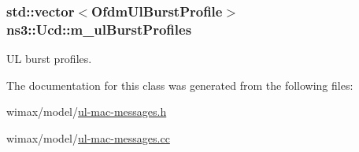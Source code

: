 \subsubsection[{\texorpdfstring{m\+\_\+ul\+Burst\+Profiles}{m_ulBurstProfiles}}]{\setlength{\rightskip}{0pt plus 5cm}std\+::vector$<${\bf Ofdm\+Ul\+Burst\+Profile}$>$ ns3\+::\+Ucd\+::m\+\_\+ul\+Burst\+Profiles\hspace{0.3cm}{\ttfamily [private]}}\hypertarget{classns3_1_1Ucd_ace3bf982ecc970c46f96b8c561df29b7}{}\label{classns3_1_1Ucd_ace3bf982ecc970c46f96b8c561df29b7}


UL burst profiles. 



The documentation for this class was generated from the following files\+:\begin{DoxyCompactItemize}
\item 
wimax/model/\hyperlink{ul-mac-messages_8h}{ul-\/mac-\/messages.\+h}\item 
wimax/model/\hyperlink{ul-mac-messages_8cc}{ul-\/mac-\/messages.\+cc}\end{DoxyCompactItemize}
